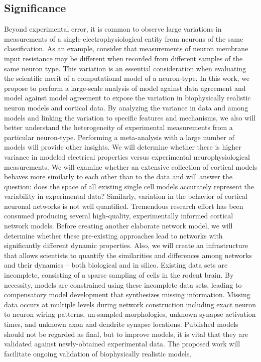 \subsection{Significance}
Beyond experimental error, it is common to observe large variations in measurements of a single electrophysiological entity from neurons of the same classification. As an example, consider that measurements of neuron membrane input resistance may be different when recorded from different samples of the same neuron type. This variation is an essential consideration when evaluating the scientific merit of a computational model of a neuron-type. In this work, we propose to perform a large-scale analysis of model against data agreement and model against model agreement to expose the variation in biophysically realistic neuron models and cortical data. By analyzing the variance in data and among models and linking the variation to specific features and mechanisms, we also will better understand the heterogeneity of experimental measurements from a particular neuron-type. Performing a meta-analysis with a large number of models will provide other insights. We will determine whether there is higher variance in modeled electrical properties versus experimental neurophysiological measurements. We will examine whether an extensive collection of cortical models behaves more similarly to each other than to the data and will answer the question: does the space of all existing single cell models accurately represent the variability in experimental data?
Similarly, variation in the behavior of cortical neuronal networks is not well quantified. Tremendous research effort has been consumed producing several high-quality, experimentally informed cortical network models. Before creating another elaborate network model, we will determine whether these pre-existing approaches lead to networks with significantly different dynamic properties. Also, we will create an infrastructure that allows scientists to quantify the similarities and differences among networks and their dynamics – both biological and in silico.\newline
\newline
Existing data sets are incomplete, consisting of a sparse sampling of cells in the rodent brain. By necessity, models are constrained using these incomplete data sets, leading to compensatory model development that synthesizes missing information. Missing data occurs at multiple levels during network construction including exact neuron to neuron wiring patterns, un-sampled morphologies, unknown synapse activation times, and unknown axon and dendrite synapse locations. Published models should not be regarded as final, but to improve models, it is vital that they are validated against newly-obtained experimental data. The proposed work will facilitate ongoing validation of biophysically realistic models. 
